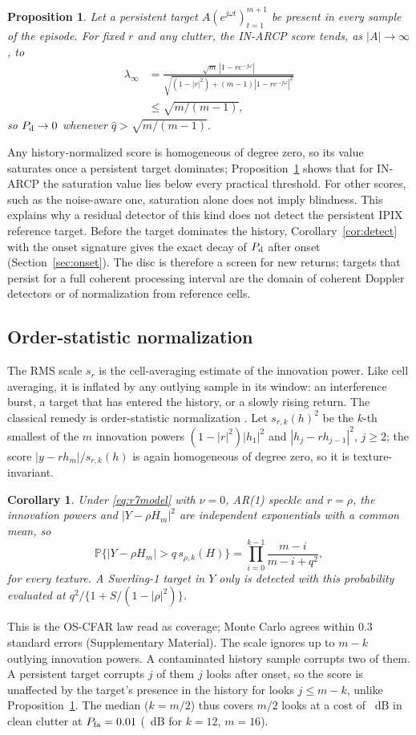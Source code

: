 \documentclass[journal]{IEEEtran}
\newtheorem{proposition}{Proposition}
\newtheorem{corollary}{Corollary}
\newcommand{\PP}{\mathbb{P}}
\begin{document}
\begin{proposition}\label{prop:blind}
Let a persistent target $A(e^{j\omega t})_{t=1}^{m+1}$ be present in every sample of the episode. For fixed $r$ and any clutter, the IN-ARCP score tends, as $|A|\to\infty$, to
\begin{align*}
\lambda_\infty&=\frac{\sqrt m\,|1-re^{-j\omega}|}{\sqrt{(1-|r|^2)+(m-1)|1-re^{-j\omega}|^2}}\\
&\le\sqrt{m/(m-1)},
\end{align*}
so $P_{\rm d}\to0$ whenever $\widehat q>\sqrt{m/(m-1)}$.
\end{proposition}
Any history-normalized score is homogeneous of degree zero, so its value saturates once a persistent target dominates; Proposition~\ref{prop:blind} shows that for IN-ARCP the saturation value lies below every practical threshold. For other scores, such as the noise-aware one, saturation alone does not imply blindness. This explains why a residual detector of this kind does not detect the persistent IPIX reference target. Before the target dominates the history, Corollary~\ref{cor:detect} with the onset signature gives the exact decay of $P_{\rm d}$ after onset (Section~\ref{sec:onset}). The disc is therefore a screen for new returns; targets that persist for a full coherent processing interval are the domain of coherent Doppler detectors or of normalization from reference cells.

\subsection{Order-statistic normalization}
The RMS scale $s_r$ is the cell-averaging estimate of the innovation power. Like cell averaging, it is inflated by any outlying sample in its window: an interference burst, a target that has entered the history, or a slowly rising return. The classical remedy is order-statistic normalization \cite{rohling1983}. Let $s_{r,k}(h)^2$ be the $k$-th smallest of the $m$ innovation powers $(1-|r|^2)|h_1|^2$ and $|h_j-rh_{j-1}|^2$, $j\ge2$; the score $|y-rh_m|/s_{r,k}(h)$ is again homogeneous of degree zero, so it is texture-invariant.
\begin{corollary}\label{cor:os}
Under \eqref{eq:r7model} with $\nu=0$, AR(1) speckle and $r=\rho$, the innovation powers and $|Y-\rho H_m|^2$ are independent exponentials with a common mean, so
\[
\PP\{|Y-\rho H_m|>q\,s_{\rho,k}(H)\}=\prod_{i=0}^{k-1}\frac{m-i}{m-i+q^2},
\]
for every texture. A Swerling-1 target in $Y$ only is detected with this probability evaluated at $q^2/\{1+S/(1-|\rho|^2)\}$.
\end{corollary}
This is the OS-CFAR law \cite{rohling1983} read as coverage; Monte Carlo agrees within 0.3 standard errors (Supplementary Material). The scale ignores up to $m-k$ outlying innovation powers. A contaminated history sample corrupts two of them. A persistent target corrupts $j$ of them $j$ looks after onset, so the score is unaffected by the target's presence in the history for looks $j\le m-k$, unlike Proposition~\ref{prop:blind}. The median ($k=m/2$) thus covers $m/2$ looks at a cost of \OSLossEight~dB in clean clutter at $P_{\rm fa}=0.01$ (\OSLossTwelve~dB for $k=12$, $m=16$).
\end{document}
